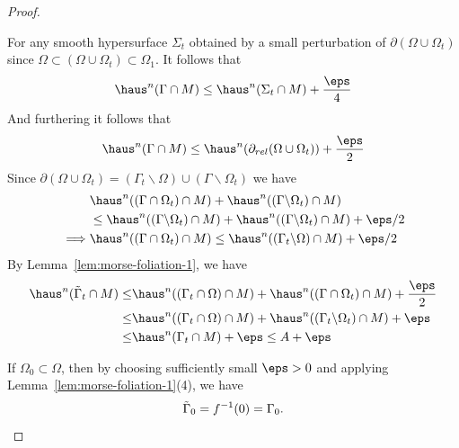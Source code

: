 \begin{lemma}
\begin{proof}
\begin{itemize}
            For any smooth hypersurface $\Sigma_t$ obtained by a small perturbation of $\partial(\Omega\cup\Omega_t)$ since $\Omega \subset (\Omega\cup\Omega
            _t) \subset \Omega_1$. It follows that 
            \begin{equation*}
                \haus^n(\Gamma\cap M) \leq \haus^n(\Sigma_t\cap M) + \frac{\eps}{4}
            \end{equation*}
            And furthering it follows that
            \begin{equation*}
                \haus^n(\Gamma\cap M) \leq \haus^n(\partial_{rel}(\Omega\cup\Omega_t)) + \frac{\eps}{2}
            \end{equation*}
            Since $\partial(\Omega\cup\Omega_t) = (\Gamma_t\backslash\Omega)\cup(\Gamma\backslash\Omega_t)$ we have
            \begin{equation*}
                \begin{split}
                    &\haus^n((\Gamma\cap\Omega_t)\cap M) + \haus^n((\Gamma\backslash\Omega_t)\cap M) \\
                    &\leq \haus^n((\Gamma\backslash\Omega_t)\cap M) + \haus^n((\Gamma\backslash\Omega_t)\cap M) + \eps/2\\
                    \implies & \haus^n((\Gamma\cap\Omega_t)\cap M) \leq \haus^n((\Gamma_t\backslash\Omega)\cap M) + \eps/2
                \end{split}
            \end{equation*}
        By Lemma~\ref{lem:morse-foliation-1}, we have
        \begin{equation*}
            \begin{split}
                \haus^n(\Tilde{\Gamma}_t\cap M) \leq& \haus^n((\Gamma_t\cap \Omega)\cap M) + \haus^n((\Gamma\cap\Omega_t)\cap M) + \frac{\eps}{2}\\
                \leq& \haus^n((\Gamma_t\cap \Omega)\cap M) + \haus^n((\Gamma_t\backslash\Omega_t)\cap M) + \eps\\
                \leq& \haus^n(\Gamma_t\cap M) + \eps \leq A + \eps
            \end{split}
        \end{equation*}
        \end{itemize}
        If $\Omega_0 \subset \Omega$, then by choosing sufficiently small $\eps > 0$ and applying Lemma~\ref{lem:morse-foliation-1}(4), we have
        \begin{equation*}
            \Tilde{\Gamma}_0 = f^{-1}(0) = \Gamma_0.
        \end{equation*}

\end{proof}
\end{lemma}
